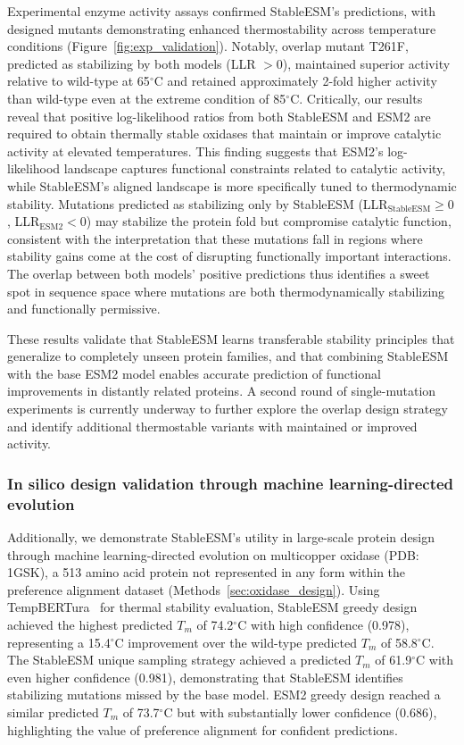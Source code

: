 \documentclass[]{fairmeta}
\begin{document}
Experimental enzyme activity assays confirmed StableESM's predictions, with designed mutants demonstrating enhanced thermostability across temperature conditions (Figure~\ref{fig:exp_validation}).
Notably, overlap mutant T261F, predicted as stabilizing by both models (LLR $> 0$), maintained superior activity relative to wild-type at 65$^\circ$C and retained approximately 2-fold higher activity than wild-type even at the extreme condition of 85$^\circ$C.
Critically, our results reveal that positive log-likelihood ratios from both StableESM and ESM2 are required to obtain thermally stable oxidases that maintain or improve catalytic activity at elevated temperatures.
This finding suggests that ESM2's log-likelihood landscape captures functional constraints related to catalytic activity, while StableESM's aligned landscape is more specifically tuned to thermodynamic stability.
Mutations predicted as stabilizing only by StableESM (LLR$_{\text{StableESM}} \geq 0$, LLR$_{\text{ESM2}} < 0$) may stabilize the protein fold but compromise catalytic function, consistent with the interpretation that these mutations fall in regions where stability gains come at the cost of disrupting functionally important interactions.
The overlap between both models' positive predictions thus identifies a sweet spot in sequence space where mutations are both thermodynamically stabilizing and functionally permissive.

These results validate that StableESM learns transferable stability principles that generalize to completely unseen protein families, and that combining StableESM with the base ESM2 model enables accurate prediction of functional improvements in distantly related proteins.
A second round of single-mutation experiments is currently underway to further explore the overlap design strategy and identify additional thermostable variants with maintained or improved activity.

\subsubsection{In silico design validation through machine learning-directed evolution}

Additionally, we demonstrate StableESM's utility in large-scale protein design through machine learning-directed evolution on multicopper oxidase (PDB: 1GSK), a 513 amino acid protein not represented in any form within the preference alignment dataset (Methods~\ref{sec:oxidase_design}).
Using TempBERTura~\citep{rodella2024temberture} for thermal stability evaluation, StableESM greedy design achieved the highest predicted $T_m$ of 74.2$^\circ$C with high confidence (0.978), representing a 15.4$^\circ$C improvement over the wild-type predicted $T_m$ of 58.8$^\circ$C.
The StableESM unique sampling strategy achieved a predicted $T_m$ of 61.9$^\circ$C with even higher confidence (0.981), demonstrating that StableESM identifies stabilizing mutations missed by the base model.
ESM2 greedy design reached a similar predicted $T_m$ of 73.7$^\circ$C but with substantially lower confidence (0.686), highlighting the value of preference alignment for confident predictions.
\end{document}
